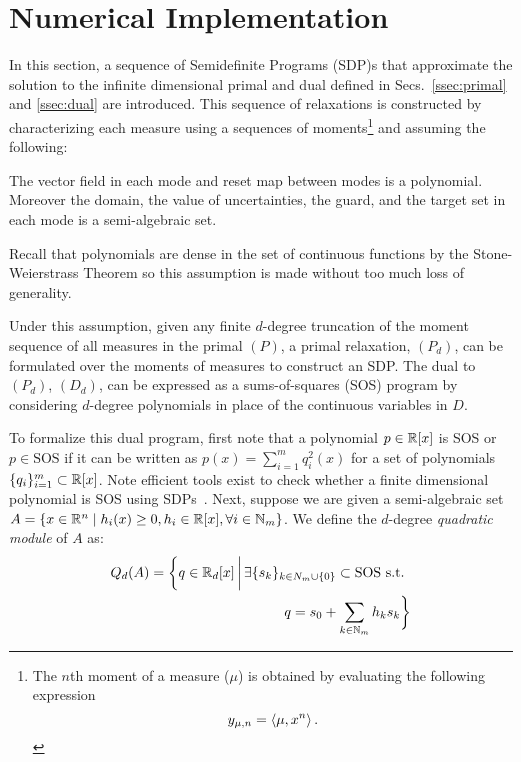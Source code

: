 \section{Numerical Implementation}
\label{sec:implementation}

In this section, a sequence of Semidefinite Programs (SDP)s that approximate the solution to the infinite dimensional primal and dual defined in Secs.~\ref{ssec:primal} and \ref{ssec:dual} are introduced.
This sequence of relaxations is constructed by characterizing each measure using a sequences of moments\footnote{The $n$th moment of a measure ($\mu$) is obtained by evaluating the following expression
  $$y_{\mu,n}=\left\langle \mu,x^n\right\rangle.$$}
and assuming the following:
\begin{assump}
The vector field in each mode and reset map between modes is a polynomial.
Moreover the domain, the value of uncertainties, the guard, and the target set in each mode is a semi-algebraic set.
  \label{assump:poly}
\end{assump}
Recall that polynomials are dense in the set of continuous functions by the Stone-Weierstrass Theorem so this assumption is made without too much loss of generality.

Under this assumption, given any finite $d$-degree truncation of the moment sequence of all measures in the primal $(P)$, a primal relaxation, $(P_d)$, can be formulated over the moments of measures to construct an SDP.
The dual to $(P_d)$, $(D_d)$, can be expressed as a sums-of-squares (SOS) program by considering $d$-degree polynomials in place of the continuous variables in $D$.

To formalize this dual program, first note that a polynomial $p \in \mathbb{R}[x]$ is SOS or $p \in \text{SOS}$ if it can be written as $p(x) = \sum_{i=1}^m q_i^2(x)$ for a set of polynomials $\{q_i\}_{i=1}^m \subset \mathbb{R}[x]$.
Note efficient tools exist to check whether a finite dimensional polynomial is SOS using SDPs~\cite{parrilo2000structured}.
Next, suppose we are given a semi-algebraic set $A = \{x \in \mathbb{R}^n \mid h_{i}(x) \geq 0, h_i \in \mathbb{R}[x], \forall i \in \mathbb{N}_m \}$.
We define the $d$-degree {\em quadratic module} of $A$ as:
\begin{align}
  \begin{split}
  Q_d(A)=\bigg\{q\in \mathbb{R}_d[x]\,\bigg|\, \exists \{s_k\}_{k \in N_m \cup \{0\}} \subset \text{SOS s.t. } \\ q=s_0+\sum_{k\in \mathbb{N}_{m}}h_{k}s_k \bigg\}
  \end{split}
\end{align}

